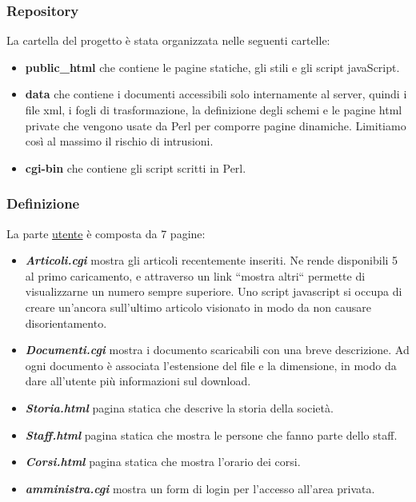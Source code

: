 \subsubsection{Repository}
	La cartella del progetto \`e stata organizzata nelle seguenti cartelle:
	\begin{itemize}
		\item {\bfseries public\_html} che contiene le pagine statiche, gli stili e gli script javaScript.
		\item {\bfseries data} che contiene i documenti accessibili solo internamente al server, quindi i file xml, i fogli di trasformazione, la definizione degli schemi e le pagine html private che vengono usate da Perl per comporre pagine dinamiche. Limitiamo cos\`i al massimo il rischio di intrusioni.
		\item {\bfseries cgi-bin} che contiene gli script scritti in Perl.
	\end{itemize}
\subsubsection{Definizione}
	\noindent La parte \underline{utente} \`e composta da 7 pagine:
\begin{itemize}
	\item {\bfseries\textit{Articoli.cgi}} mostra gli articoli recentemente inseriti. Ne rende disponibili 5 al primo caricamento, e attraverso un link “mostra altri“ permette di visualizzarne un numero sempre superiore. Uno script javascript si occupa di creare un'ancora sull'ultimo articolo visionato in modo da non causare disorientamento.
	\item {\bfseries\textit{Documenti.cgi}} mostra i documento scaricabili con una breve descrizione. Ad ogni documento \`e associata l'estensione del file e la dimensione, in modo da dare all'utente pi\`u informazioni sul download.
	\item {\bfseries\textit{Storia.html}} pagina statica che descrive la storia della societ\`a.
	\item {\bfseries\textit{Staff.html}} pagina statica che mostra le persone che fanno parte dello staff.
	\item {\bfseries\textit{Corsi.html}} pagina statica che mostra l'orario dei corsi.
	\item {\bfseries\textit{amministra.cgi}} mostra un form di login per l'accesso all'area privata.
\end{itemize}

